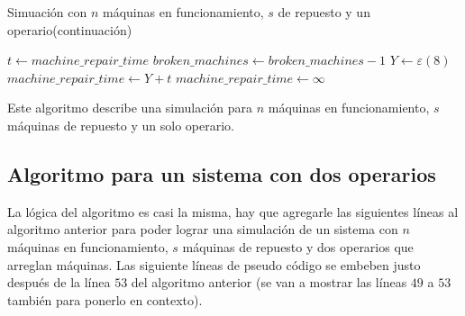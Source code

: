 \documentclass[12pt]{article}
\begin{document}
\begin{algorithm}
\ContinuedFloat
\caption{Simuación con $n$ máquinas en funcionamiento, $s$ de repuesto y un operario(continuación)}
\begin{algorithmic}
  \Else
    \State $t \gets machine\_repair\_time$
    \State $broken\_machines \gets broken\_machines - 1$
      \State $Y \gets \varepsilon(8)$
      \State $machine\_repair\_time \gets Y + t$
    \EndIf
      \State $machine\_repair\_time \gets \infty$
    \EndIf
  \EndIf
\EndWhile
{}
\EndProcedure
\end{algorithmic}
\end{algorithm}

Este algoritmo describe una simulación para $n$ máquinas en funcionamiento, $s$ máquinas de repuesto
y un solo operario.
\clearpage

\subsection{Algoritmo para un sistema con dos operarios}

La lógica del algoritmo es casi la misma, hay que agregarle las siguientes líneas al algoritmo anterior
para poder lograr una simulación de un sistema con $n$ máquinas en funcionamiento, $s$ máquinas de repuesto
y dos operarios que arreglan máquinas. Las siguiente líneas de pseudo código se embeben justo después de la línea $53$
del algoritmo anterior (se van a mostrar las líneas $49$ a $53$ también para ponerlo en contexto).
\end{document}
